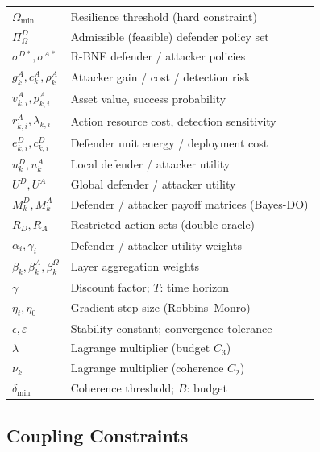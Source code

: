 \documentclass[conference]{IEEEtran}
\begin{document}
\begin{table}[t]
\begin{tabular}{ll}
$\Omega_{\min}$ & Resilience threshold (hard constraint) \\
$\Pi^D_\Omega$ & Admissible (feasible) defender policy set \\
$\sigma^{D*},\sigma^{A*}$ & R-BNE defender / attacker policies \\
$g_k^A,c_k^A,\rho_k^A$ & Attacker gain / cost / detection risk \\
$v_{k,i}^A,p_{k,i}^A$ & Asset value, success probability \\
$r_{k,i}^A,\lambda_{k,i}$ & Action resource cost, detection sensitivity \\
$e_{k,i}^D,c_{k,i}^D$ & Defender unit energy / deployment cost \\
$u_k^D,u_k^A$ & Local defender / attacker utility \\
$U^D,U^A$ & Global defender / attacker utility \\
$M_k^D,M_k^A$ & Defender / attacker payoff matrices (Bayes-DO) \\
$R_D,R_A$ & Restricted action sets (double oracle) \\
$\alpha_i,\gamma_i$ & Defender / attacker utility weights \\
$\beta_k,\beta_k^A,\beta_k^\Omega$ & Layer aggregation weights \\
$\gamma$ & Discount factor; \;$T$: time horizon \\
$\eta_t,\eta_0$ & Gradient step size (Robbins--Monro) \\
$\epsilon,\varepsilon$ & Stability constant; convergence tolerance \\
$\lambda$ & Lagrange multiplier (budget $C_3$) \\
$\nu_k$ & Lagrange multiplier (coherence $C_2$) \\
$\delta_{\min}$ & Coherence threshold; \;$B$: budget \\
\bottomrule
\end{tabular}
\end{table}

\subsection{Coupling Constraints}
\end{document}

